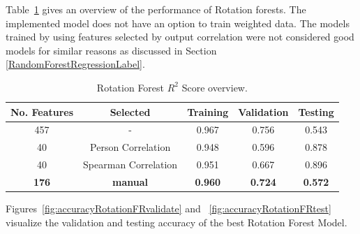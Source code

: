 \documentclass[11pt]{article}
\begin{document}
Table~\ref{table:4} gives an overview of the performance of Rotation forests.
The implemented model does not have an option to train weighted data.
The models trained by using features selected by output correlation were not considered good models for similar reasons as discussed in Section \ref{RandomForestRegressionLabel}.

\begin{table} [h!]
\centering
\resizebox{\linewidth}{!} {
 \begin{tabular}{ | c | c | c | c | c | }
\hline
\textbf{No.  Features} & \textbf{Selected} & \textbf{Training} & \textbf{Validation} & \textbf{Testing} \\ [0.5 ex]
\hline \hline
457 & - & 0.967 & 0.756 & 0.543\\
40 & Person Correlation & 0.948 & 0.596 & 0.878\\
40 & Spearman Correlation & 0.951 & 0.667 &0.896 \\
\textbf{176} & \textbf{manual} & \textbf{0.960} & \textbf{0.724} & \textbf{0.572} \\ [1ex]
\hline
\end{tabular}
}
\caption{Rotation Forest $R^2$ Score overview.}
\label {table:4}
\end{table}

Figures~\ref{fig:accuracyRotationFRvalidate} and ~\ref{fig:accuracyRotationFRtest} visualize the validation and testing accuracy of the best Rotation Forest Model.
\end{document}
